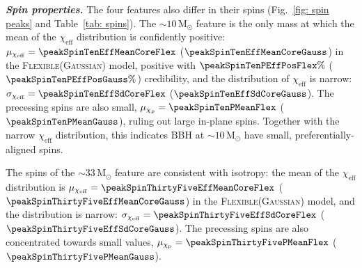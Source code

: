 \documentclass[%
    aps,
    prl,
    reprint,
    superscriptaddress,
    nolongbibliography,
    nobibnotes,
    nofootinbib,
    linenumbers,
    amsmath,amssymb,
]{revtex4-2}
\newcommand{\Msun}{\ensuremath{\mathrm{M}_{\odot}}}
\newcommand{\chieff}{\ensuremath{\chi_{\mathrm{eff}}}}
\newcommand{\chip}{\ensuremath{\chi_{\mathrm{p}}}}
\newcommand{\jh}[1]{{\color{orange}JH: #1}}
\newcommand{\flexiblespins}{\textsc{Flexible}\xspace}
\newcommand{\gaussianspins}{\textsc{Gaussian}\xspace}
\newcommand{\featTen}{10\xspace}
\newcommand{\featTwenty}{21\xspace}
\newcommand{\featThirtyFive}{33\xspace}
\newcommand{\featSixty}{59\xspace}
\newcommand{\heading}[1]{\textbf{\textit{#1}}}
\begin{document}

\heading{Spin properties.}
The four features also differ in their spins (Fig.~\ref{fig: spin peaks} and Table~\ref{tab: spins}). The $\sim \featTen\,\Msun$ feature is the only mass at which the mean of the $\chieff$ distribution is confidently positive: $\mu_{\chieff} = \peakSpinTenEffMeanCoreFlex$ ($\peakSpinTenEffMeanCoreGauss$) in the \flexiblespins (\gaussianspins) model, positive with $\peakSpinTenPEffPosFlex\%$ ($\peakSpinTenPEffPosGauss\%$) credibility, and the distribution of $\chieff$ is narrow: $\sigma_{\chieff} = \peakSpinTenEffSdCoreFlex$ ($\peakSpinTenEffSdCoreGauss$). The precessing spins are also small, $\mu_{\chip} = \peakSpinTenPMeanFlex$ ($\peakSpinTenPMeanGauss$), ruling out large in-plane spins. Together with the narrow $\chieff$ distribution, this indicates \ac{BBH} at $\sim\featTen \,\Msun$ have small, preferentially-aligned spins. %

The spins of the $\sim \featThirtyFive\,\Msun$ feature are consistent with isotropy: the mean of the $\chieff$ distribution is $\mu_{\chieff} = \peakSpinThirtyFiveEffMeanCoreFlex$ ($\peakSpinThirtyFiveEffMeanCoreGauss$) in the \flexiblespins (\gaussianspins) model, and the distribution is narrow: $\sigma_{\chieff} = \peakSpinThirtyFiveEffSdCoreFlex$ ($\peakSpinThirtyFiveEffSdCoreGauss$). The precessing spins are also concentrated towards small values, $\mu_{\chip} = \peakSpinThirtyFivePMeanFlex$ ($\peakSpinThirtyFivePMeanGauss$).
\end{document}
